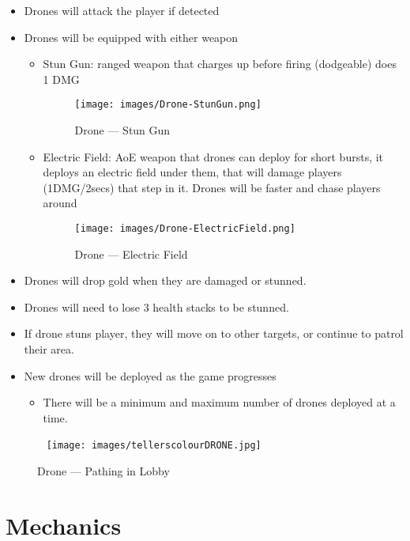 \documentclass[10pt]{report}
\begin{document}
\begin{itemize}
    \item Drones will attack the player if detected
    \item Drones will be equipped with either weapon                    
    \begin{itemize}
        \item Stun Gun: ranged weapon that charges up before firing (dodgeable) does 1 DMG
        \begin{figure}[H]
            \centering
            \texttt{[image: images/Drone-StunGun.png]}
            \caption{Drone --- Stun Gun}
        \end{figure}
        \item Electric Field: AoE weapon that drones can deploy for short bursts, it deploys an electric field under them, that will damage  players (1DMG/2secs) that step in it. Drones will be faster and chase players around
        \begin{figure}[H]
            \centering
            \texttt{[image: images/Drone-ElectricField.png]}
            \caption{Drone --- Electric Field}
        \end{figure}
    \end{itemize}
    \item Drones will drop gold when they are damaged or stunned.
    \item Drones will need to lose 3 health stacks to be stunned.
    \item If drone stuns player, they will move on to other targets, or continue to patrol their area.
    \item New drones will be deployed as the game progresses
    \begin{itemize}
        \item There will be a minimum and maximum number of drones deployed at a time.
    \end{itemize}
\end{itemize}

\begin{figure}[H]\
    \centering
    \texttt{[image: images/tellerscolourDRONE.jpg]}
    \caption{Drone --- Pathing in Lobby}
\end{figure}

\section{Mechanics}
\end{document}
